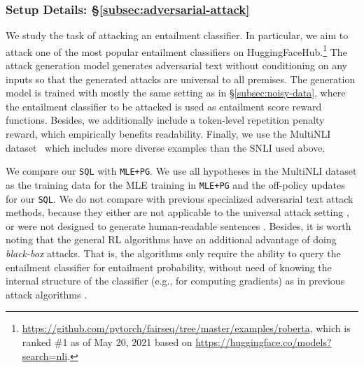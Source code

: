 \subsubsection{Setup Details: \S\ref{subsec:adversarial-attack}}
\label{appendix-subsubsec:setup-adversarial-attack}
We study the task of attacking an entailment classifier. 
In particular, we aim to attack one of the most popular entailment classifiers on HuggingFaceHub.\footnote{\url{https://github.com/pytorch/fairseq/tree/master/examples/roberta}, which is ranked \#1 as of May 20, 2021 based on \url{https://huggingface.co/models?search=nli}.} 
The attack generation model generates adversarial text without conditioning on any inputs so that the generated attacks are universal to all premises.  
The generation model is trained with mostly the same setting as in \S\ref{subsec:noisy-data}, where the entailment classifier to be attacked is used as entailment score reward functions. Besides, we additionally include a token-level repetition penalty reward, which empirically benefits readability.
Finally, we use the MultiNLI dataset~\citep{williams2018broad} which includes more diverse examples than the SNLI used above. 

We compare our \texttt{SQL} with \texttt{MLE+PG}. We use all hypotheses in the MultiNLI dataset as the training data for the MLE training in \texttt{MLE+PG} and the off-policy updates for our \texttt{SQL}.
We do not compare with previous specialized adversarial text attack methods, because they either are not applicable to the universal attack setting \citep{morris2020textattack,jin2020bert,ebrahimi2017hotflip}, or were not designed to generate human-readable sentences \citep{wallace2019universal}. Besides, it is worth noting that the general RL algorithms have an additional advantage of doing \textit{black-box} attacks. That is, the algorithms only require the ability to query the entailment classifier for entailment probability, without need of knowing the internal structure of the classifier (e.g., for computing gradients) as in previous attack algorithms \citep{ebrahimi2017hotflip,wallace2019universal}.



